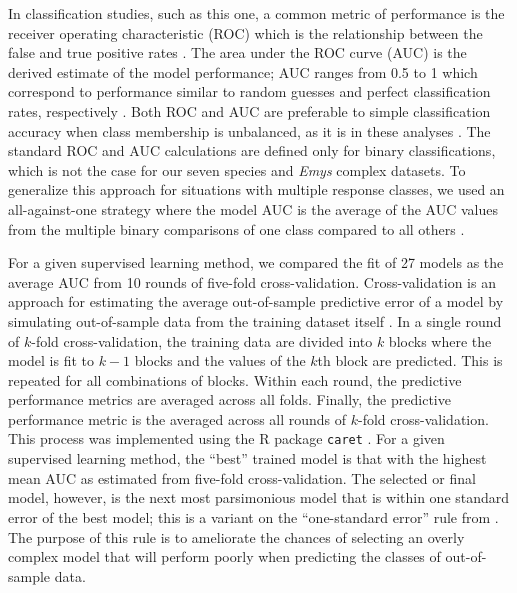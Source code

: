 \documentclass[12pt,letterpaper]{article}
\begin{document}
In classification studies, such as this one, a common metric of performance is the receiver operating characteristic (ROC) which is the relationship between the false and true positive rates \citep{Hastie2009}. The area under the ROC curve (AUC) is the derived estimate of the model performance; AUC ranges from 0.5 to 1 which correspond to performance similar to random guesses and perfect classification rates, respectively \citep{Hastie2009}. Both ROC and AUC are preferable to simple classification accuracy when class membership is unbalanced, as it is in these analyses \citep{Hastie2009}. The standard ROC and AUC calculations are defined only for binary classifications, which is not the case for our seven species and \textit{Emys} complex datasets. To generalize this approach for situations with multiple response classes, we used an all-against-one strategy where the model AUC is the average of the AUC values from the multiple binary comparisons of one class compared to all others \citep{Hand2001}. 

For a given supervised learning method, we compared the fit of 27 models as the average AUC from 10 rounds of five-fold cross-validation. Cross-validation is an approach for estimating the average out-of-sample predictive error of a model by simulating out-of-sample data from the training dataset itself \citep{Hastie2009}. In a single round of \(k\)-fold cross-validation, the training data are divided into \(k\) blocks where the model is fit to \(k - 1\) blocks and the values of the \(k\)th block are predicted. This is repeated for all combinations of blocks. Within each round, the predictive performance metrics are averaged across all folds. Finally, the predictive performance metric is the averaged across all rounds of \(k\)-fold cross-validation. This process was implemented using the R package \texttt{caret} \citep{KuhnMAN2013}. For a given supervised learning method, the ``best'' trained model is that with the highest mean AUC as estimated from five-fold cross-validation. The selected or final model, however, is the next most parsimonious model that is within one standard error of the best model; this is a variant on the ``one-standard error'' rule from \citet{Hastie2009}. The purpose of this rule is to ameliorate the chances of selecting an overly complex model that will perform poorly when predicting the classes of out-of-sample data.
\end{document}
